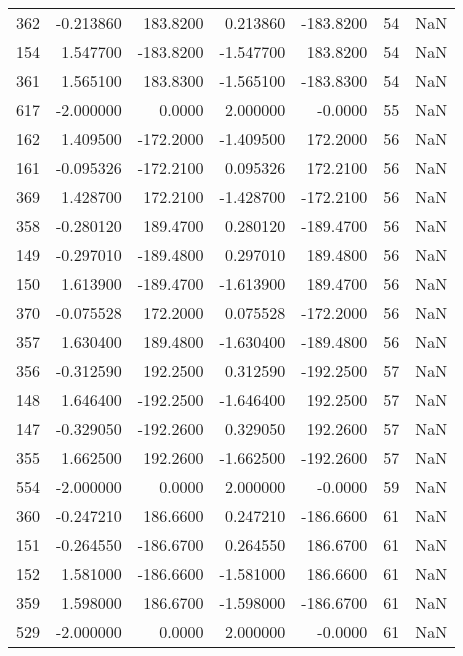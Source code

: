 \begin{tabular}{rrrrrrr}
 362 &   -0.213860 &  183.8200 &    0.213860 &   -183.8200 &          54 & NaN \\
 154 &    1.547700 & -183.8200 &   -1.547700 &    183.8200 &          54 & NaN \\
 361 &    1.565100 &  183.8300 &   -1.565100 &   -183.8300 &          54 & NaN \\
 617 &   -2.000000 &    0.0000 &    2.000000 &     -0.0000 &          55 & NaN \\
 162 &    1.409500 & -172.2000 &   -1.409500 &    172.2000 &          56 & NaN \\
 161 &   -0.095326 & -172.2100 &    0.095326 &    172.2100 &          56 & NaN \\
 369 &    1.428700 &  172.2100 &   -1.428700 &   -172.2100 &          56 & NaN \\
 358 &   -0.280120 &  189.4700 &    0.280120 &   -189.4700 &          56 & NaN \\
 149 &   -0.297010 & -189.4800 &    0.297010 &    189.4800 &          56 & NaN \\
 150 &    1.613900 & -189.4700 &   -1.613900 &    189.4700 &          56 & NaN \\
 370 &   -0.075528 &  172.2000 &    0.075528 &   -172.2000 &          56 & NaN \\
 357 &    1.630400 &  189.4800 &   -1.630400 &   -189.4800 &          56 & NaN \\
 356 &   -0.312590 &  192.2500 &    0.312590 &   -192.2500 &          57 & NaN \\
 148 &    1.646400 & -192.2500 &   -1.646400 &    192.2500 &          57 & NaN \\
 147 &   -0.329050 & -192.2600 &    0.329050 &    192.2600 &          57 & NaN \\
 355 &    1.662500 &  192.2600 &   -1.662500 &   -192.2600 &          57 & NaN \\
 554 &   -2.000000 &    0.0000 &    2.000000 &     -0.0000 &          59 & NaN \\
 360 &   -0.247210 &  186.6600 &    0.247210 &   -186.6600 &          61 & NaN \\
 151 &   -0.264550 & -186.6700 &    0.264550 &    186.6700 &          61 & NaN \\
 152 &    1.581000 & -186.6600 &   -1.581000 &    186.6600 &          61 & NaN \\
 359 &    1.598000 &  186.6700 &   -1.598000 &   -186.6700 &          61 & NaN \\
 529 &   -2.000000 &    0.0000 &    2.000000 &     -0.0000 &          61 & NaN \\

\end{tabular}
